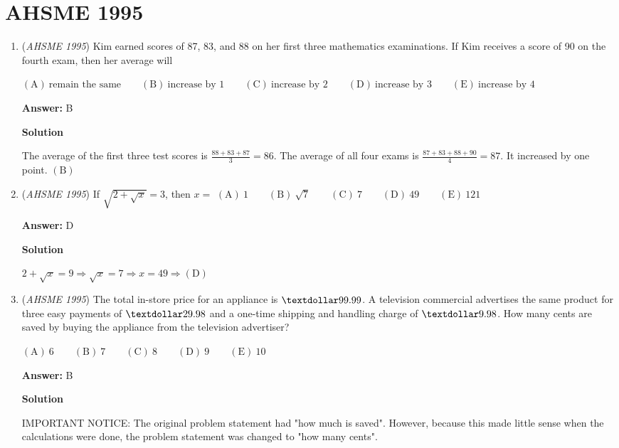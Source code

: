 \section{AHSME 1995}
        \begin{enumerate}
        	\item (\textit{AHSME 1995}) Kim earned scores of 87, 83, and 88 on her first three mathematics examinations. If Kim receives a score of 90 on the fourth exam, then her average will 


 $\mathrm{(A) \ \text{remain the same} } \qquad \mathrm{(B) \ \text{increase by 1} } \qquad \mathrm{(C) \ \text{increase by 2} } \qquad \mathrm{(D) \ \text{increase by 3} } \qquad \mathrm{(E) \ \text{increase by 4} }$

 \textbf{Answer: }B



\textbf{Solution}

The average of the first three test scores is $\frac{88+83+87}{3}=86$. The average of all four exams is $\frac{87+83+88+90}{4}=87$. It increased by one point. $\mathrm{(B)}$



	\item (\textit{AHSME 1995}) If $\sqrt {2 + \sqrt {x}} = 3$, then $x =$
$\mathrm{(A) \ 1 } \qquad \mathrm{(B) \ \sqrt{7} } \qquad \mathrm{(C) \ 7 } \qquad \mathrm{(D) \ 49 } \qquad \mathrm{(E) \ 121 }$

 \textbf{Answer: }D



\textbf{Solution}

$2 + \sqrt{x} = 9 \Longrightarrow \sqrt{x} = 7 \Longrightarrow x = 49 \Rightarrow \mathrm{(D)}$



	\item (\textit{AHSME 1995}) The total in-store price for an appliance is $\textdollar 99.99$. A television commercial advertises the same product for three easy payments of $\textdollar 29.98$ and a one-time shipping and handling charge of $\textdollar 9.98$. How many cents are saved by buying the appliance from the television advertiser?


 $\mathrm{(A) \ 6 } \qquad \mathrm{(B) \ 7 } \qquad \mathrm{(C) \ 8 } \qquad \mathrm{(D) \ 9 } \qquad \mathrm{(E) \ 10 }$

 \textbf{Answer: }B



\textbf{Solution}

IMPORTANT NOTICE: The original problem statement had "how much is saved". However, because this made little sense when the calculations were done, the problem statement was changed to "how many cents".


\end{enumerate}
